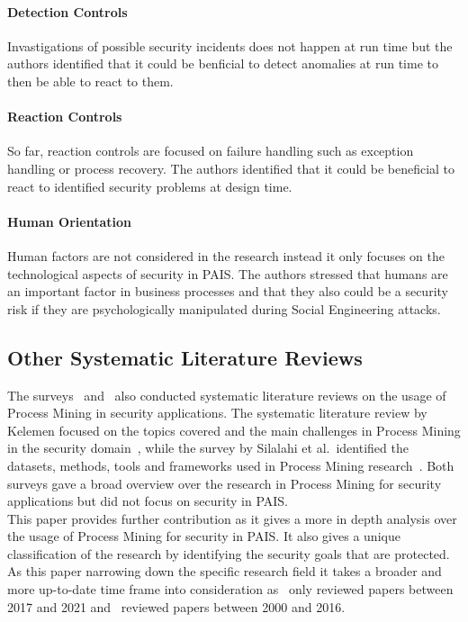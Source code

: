 \documentclass[runningheads]{llncs}
\begin{document}
\paragraph{Detection Controls} Invastigations of possible security incidents does not happen at run time but the authors identified that it could be benficial to detect anomalies
at run time to then be able to react to them.
\paragraph{Reaction Controls} So far, reaction controls are focused on failure handling such as exception handling or process recovery. The authors identified that it could be beneficial
to react to identified security problems at design time.
\paragraph{Human Orientation} Human factors are not considered in the research instead it only focuses on the technological aspects of security in PAIS\@. The authors stressed that
humans are an important factor in business processes and that they also could be a security risk if they are psychologically manipulated during Social Engineering attacks. 
\subsection{Other Systematic Literature Reviews}\label{Other}
The surveys~\cite{Kelemen_2018} and~\cite{Silalahi20221} also conducted systematic literature reviews on the usage of Process Mining in security applications. The systematic literature review
by Kelemen focused on the topics covered and the main challenges in Process Mining in the security domain~\cite{Kelemen_2018}, while the survey by Silalahi et al.\ identified the datasets,
methods, tools and frameworks used in Process Mining research~\cite{Silalahi20221}. Both surveys gave a broad overview over the research in Process Mining for security applications but did not
focus on security in PAIS\@.\\
This paper provides further contribution as it gives a more in depth analysis over the usage of Process Mining for security in PAIS\@. It also gives a unique classification of the research by 
identifying the security goals that are protected. As this paper narrowing down the specific research field it takes a broader and more up-to-date time frame into consideration as~\cite{Silalahi20221} only reviewed
papers between 2017 and 2021 and~\cite{Kelemen_2018} reviewed papers between 2000 and 2016.
\end{document}
